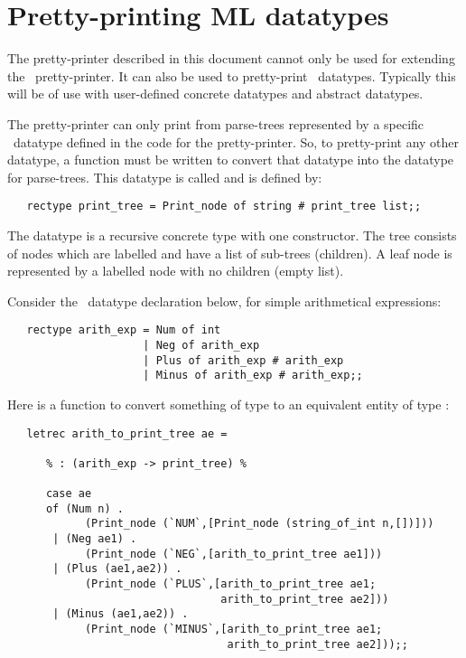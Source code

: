 
\chapter{Pretty-printing ML datatypes\label{mldatatypes}}

The pretty-printer described in this document cannot only be used for
extending the \HOL\ pretty-printer. It can also be used to pretty-print \ML\
datatypes. Typically this will be of use with user-defined concrete datatypes
and abstract datatypes.

The pretty-printer can only print from parse-trees represented by a specific
\ML\ datatype defined in the code for the pretty-printer. So, to pretty-print
any other datatype, a function must be written to convert that datatype into
the datatype for parse-trees. This datatype is called \ml{print\_tree} and is
defined by:

\begin{small}\begin{verbatim}
   rectype print_tree = Print_node of string # print_tree list;;
\end{verbatim}\end{small}

\noindent
The datatype is a recursive concrete type with one constructor. The tree
consists of nodes which are labelled and have a list of sub-trees (children).
A leaf node is represented by a labelled node with no children (empty list).

Consider the \ML\ datatype declaration below, for simple arithmetical
expressions:

\begin{small}\begin{verbatim}
   rectype arith_exp = Num of int
                     | Neg of arith_exp
                     | Plus of arith_exp # arith_exp
                     | Minus of arith_exp # arith_exp;;
\end{verbatim}\end{small}

\noindent
Here is a function to convert something of type  to an
equivalent entity of type \ml{print\_tree}:

\begin{small}\begin{verbatim}
   letrec arith_to_print_tree ae =

      % : (arith_exp -> print_tree) %

      case ae
      of (Num n) .
            (Print_node (`NUM`,[Print_node (string_of_int n,[])]))
       | (Neg ae1) .
            (Print_node (`NEG`,[arith_to_print_tree ae1]))
       | (Plus (ae1,ae2)) .
            (Print_node (`PLUS`,[arith_to_print_tree ae1;
                                 arith_to_print_tree ae2]))
       | (Minus (ae1,ae2)) .
            (Print_node (`MINUS`,[arith_to_print_tree ae1;
                                  arith_to_print_tree ae2]));;
\end{verbatim}\end{small}

